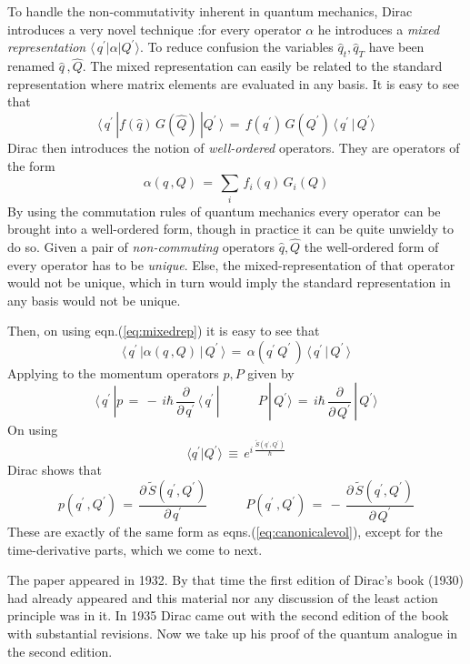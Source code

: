 \documentclass[a4paper]{JHEP3}
\newcommand{\be}{\begin{equation}}
\newcommand{\ee}{\end{equation}}
\begin{document}
To handle the non-commutativity inherent in quantum mechanics, Dirac introduces a very novel technique \cite{diracpaper}:for every operator
$\alpha$ he introduces a {\it mixed representation} $\langle\,q^\prime|\alpha|Q^\prime\rangle$. To reduce confusion the variables 
${\hat q}_t, {\hat q}_T$
have been renamed ${\hat q}\,,{\hat Q}$. The mixed representation can easily be related to the standard representation where matrix elements 
are evaluated 
in any basis. It is easy to see that
\be
\label{eq:mixedrep}
\langle\,q^\prime\,|f({\hat q})\,G({\hat Q})\,|Q^\prime\,\rangle\,=\,f(q^\prime)\,G(Q^\prime)\,\langle\,q^\prime\,|\,Q^\prime\rangle
\ee
Dirac then introduces the notion of {\it well-ordered} operators. They are operators of the form 
\be
\label{eq:wellordered}
\alpha(q\,,Q)\,=\,\sum_i\,f_i(q)\,G_i(Q)
\ee
By using the commutation rules of quantum mechanics every operator can be brought into a well-ordered form, though in practice it can be
quite unwieldy to do so. Given a pair of \emph{non-commuting} operators ${\hat q}, {\hat Q}$ the well-ordered form of every operator has
to be \emph{unique}. Else, the mixed-representation of that operator would not be unique, which in turn would imply the standard representation
in any basis would not be unique.

Then, on using eqn.(\ref{eq:mixedrep}) it is easy to see that
\be
\label{eq:mixedrep2}
\langle\,q^\prime\,|\alpha(q\,,Q)\,|\,Q^\prime\,\rangle\,=\,\alpha(q^\prime\,Q^\prime\,)\,\langle\,q^\prime\,|\,Q^\prime\,\rangle
\ee
Applying to the momentum operators $p,P$ given by
\be
\label{eq:momenta}
\langle\,q^\prime\,|p\,=\,-\,i\hbar\,\frac{\partial}{\partial\,q^\prime}\,\langle\,q^\prime\,|\quad\quad\quad
P\,|\,Q^\prime\rangle\,=\,i\hbar\,\frac{\partial}{\partial\,Q^\prime}\,|\,Q^\prime\rangle
\ee
On using
\be
\langle q^\prime|Q^\prime \rangle\,\equiv\,e^{i\,\frac{{\tilde S}(q^\prime,Q^\prime)}{\hbar}}
\ee
Dirac shows that
\be
\label{eq:qanalog2}
p(q^\prime\,,Q^\prime)\,=\,\frac{\partial\,{\tilde S}(q^\prime,Q^\prime)}{\partial\,q^\prime}\quad\quad\quad
P(q^\prime\,,Q^\prime)\,=\,-\,\frac{\partial\,{\tilde S}(q^\prime,Q^\prime)}{\partial\,Q^\prime}
\ee
These are exactly of the same form as eqns.(\ref{eq:canonicalevol}), except for the time-derivative parts, which we come to next.

The paper \cite{diracpaper} appeared in 1932. By that time the first edition of Dirac's book (1930) \cite{diracbook1} had already
appeared and this material nor any discussion of the least action principle was in it. In 1935 Dirac came out with the second edition
of the book \cite{diracbook2} with substantial revisions. Now we take up his proof of the quantum analogue in the second edition.
\end{document}
